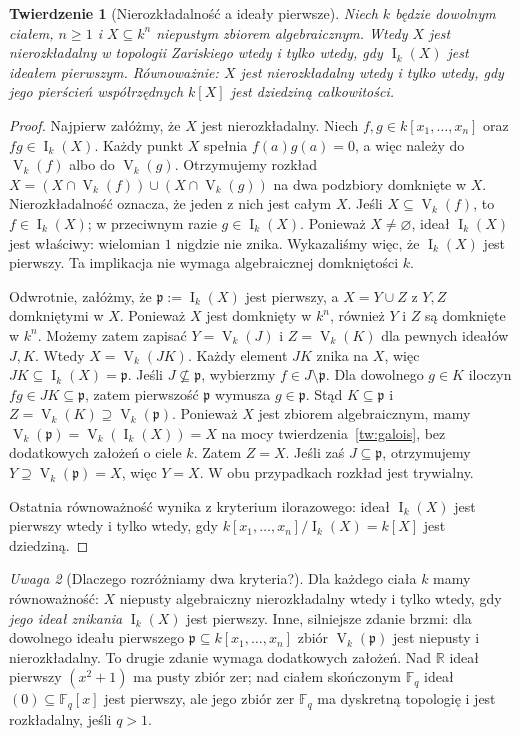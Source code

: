 \documentclass[11pt,a4paper,openany]{report}
\numberwithin{equation}{section}
\theoremstyle{plain}
\newtheorem{twierdzenie}{Twierdzenie}[section]
\theoremstyle{definition}
\theoremstyle{remark}
\newtheorem{uwaga}[twierdzenie]{Uwaga}
\newcommand{\R}{\mathbb R}
\newcommand{\F}{\mathbb F}
\newcommand{\V}{\operatorname V}
\newcommand{\I}{\operatorname I}
\begin{document}
\begin{twierdzenie}[Nierozkładalność a ideały pierwsze]
\label{tw:irreducible-prime}
Niech $k$ będzie dowolnym ciałem, $n\ge1$
i $X\subseteq k^n$ niepustym zbiorem algebraicznym.
Wtedy $X$ jest nierozkładalny w topologii Zariskiego
wtedy i tylko wtedy, gdy $\I_k(X)$ jest ideałem pierwszym.
Równoważnie: $X$ jest nierozkładalny wtedy i tylko wtedy,
gdy jego pierścień współrzędnych $k[X]$ jest dziedziną całkowitości.
\end{twierdzenie}
\begin{proof}
Najpierw załóżmy, że $X$ jest nierozkładalny.
Niech $f,g\in k[x_1,\dots,x_n]$ oraz $fg\in\I_k(X)$.
Każdy punkt $X$ spełnia $f(a)g(a)=0$,
a więc należy do $\V_k(f)$ albo do $\V_k(g)$.
Otrzymujemy rozkład
$X=(X\cap\V_k(f))\cup(X\cap\V_k(g))$
na dwa podzbiory domknięte w $X$. Nierozkładalność oznacza,
że jeden z nich jest całym $X$.
Jeśli $X\subseteq\V_k(f)$, to $f\in\I_k(X)$;
w przeciwnym razie $g\in\I_k(X)$. Ponieważ $X\ne\varnothing$,
ideał $\I_k(X)$ jest właściwy: wielomian $1$ nigdzie nie znika.
Wykazaliśmy więc, że $\I_k(X)$ jest pierwszy.
Ta implikacja nie wymaga algebraicznej domkniętości $k$.

Odwrotnie, załóżmy, że $\mathfrak p:=\I_k(X)$ jest pierwszy,
a $X=Y\cup Z$ z $Y,Z$ domkniętymi w $X$.
Ponieważ $X$ jest domknięty w $k^n$, również $Y$ i $Z$
są domknięte w $k^n$. Możemy zatem zapisać
$Y=\V_k(J)$ i $Z=\V_k(K)$ dla pewnych ideałów $J,K$.
Wtedy $X=\V_k(JK)$.
Każdy element $JK$ znika na $X$, więc $JK\subseteq\I_k(X)=\mathfrak p$.
Jeśli $J\not\subseteq\mathfrak p$, wybierzmy $f\in J\setminus\mathfrak p$.
Dla dowolnego $g\in K$ iloczyn $fg\in JK\subseteq\mathfrak p$,
zatem pierwszość $\mathfrak p$ wymusza $g\in\mathfrak p$.
Stąd $K\subseteq\mathfrak p$ i
$Z=\V_k(K)\supseteq\V_k(\mathfrak p)$.
Ponieważ $X$ jest zbiorem algebraicznym, mamy
$\V_k(\mathfrak p)=\V_k(\I_k(X))=X$
na mocy twierdzenia~\ref{tw:galois}, bez dodatkowych
założeń o ciele $k$. Zatem $Z=X$.
Jeśli zaś $J\subseteq\mathfrak p$, otrzymujemy
$Y\supseteq\V_k(\mathfrak p)=X$, więc $Y=X$.
W obu przypadkach rozkład jest trywialny.

Ostatnia równoważność wynika z kryterium ilorazowego:
ideał $\I_k(X)$ jest pierwszy wtedy i tylko wtedy,
gdy $k[x_1,\dots,x_n]/\I_k(X)=k[X]$ jest dziedziną.
\end{proof}

\begin{uwaga}[Dlaczego rozróżniamy dwa kryteria?]
Dla każdego ciała $k$ mamy równoważność:
$X$ niepusty algebraiczny nierozkładalny wtedy i tylko wtedy,
gdy \emph{jego ideał znikania} $\I_k(X)$ jest pierwszy.
Inne, silniejsze zdanie brzmi: dla dowolnego ideału pierwszego
$\mathfrak p\subseteq k[x_1,\dots,x_n]$ zbiór
$\V_k(\mathfrak p)$ jest niepusty i nierozkładalny.
To drugie zdanie wymaga dodatkowych założeń. Nad $\R$
ideał pierwszy $(x^2+1)$ ma pusty zbiór zer; nad ciałem
skończonym $\F_q$ ideał $(0)\subseteq\F_q[x]$
jest pierwszy, ale jego zbiór zer $\F_q$ ma dyskretną
topologię i jest rozkładalny, jeśli $q>1$.
\end{uwaga}
\end{document}

